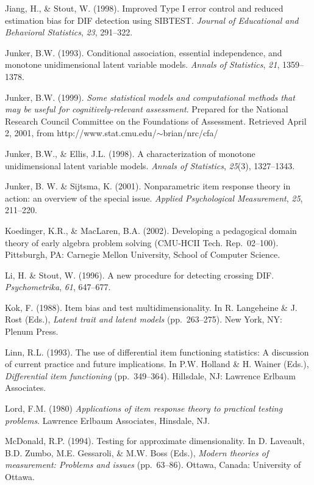 \documentclass[titlepage,11pt,twoside]{article}
\begin{document}
\begin{thebibliography}
\bibitem Jiang, H., \& Stout, W. (1998). Improved Type I error control and reduced estimation bias for DIF detection using SIBTEST. \textit{Journal of Educational and Behavioral Statistics}, \textit{23}, 291--322.

\bibitem Junker, B.W. (1993). Conditional association, essential independence, and monotone unidimensional latent variable models. \textit{Annals of Statistics}, \textit{21}, 1359--1378.

\bibitem Junker, B.W. (1999). \textit{Some statistical models and computational methods that may be useful for cognitively-relevant assessment}. Prepared for the National Research Council Committee on the Foundations of Assessment. Retrieved April 2, 2001, from \mbox{http://www.stat.cmu.edu/$\sim $brian/nrc/cfa/}

\bibitem Junker, B.W., \& Ellis, J.L. (1998). A characterization of monotone unidimensional latent variable models. \textit{Annals of Statistics}, \textit{25}(3), 1327--1343.

\bibitem Junker, B. W. \& Sijtsma, K. (2001). Nonparametric item response theory in action: an overview of the special issue. \textit{Applied Psychological Measurement}, \textit{25}, 211--220.

\bibitem Koedinger, K.R., \& MacLaren, B.A. (2002). Developing a pedagogical domain theory of early algebra problem solving (CMU-HCII Tech. Rep.~02--100). Pittsburgh, PA: Carnegie Mellon University, School of Computer Science.

\bibitem Li, H. \& Stout, W. (1996). A new procedure for detecting crossing DIF. \textit{Psychometrika}, \textit{61}, 647--677.

\bibitem Kok, F. (1988). Item bias and test multidimensionality. In R. Langeheine \& J. Rost (Eds.), \textit{Latent trait and latent models} (pp.~263--275). New York, NY: Plenum Press.

\bibitem Linn, R.L. (1993). The use of differential item functioning statistics: A discussion of current practice and future implications. In P.W. Holland \& H. Wainer (Eds.), \textit{Differential item functioning} (pp.~349--364). Hillsdale, NJ: Lawrence Erlbaum Associates.


\bibitem Lord, F.M. (1980) \textit{Applications of item response theory to practical testing problems}. Lawrence Erlbaum Associates, Hinsdale, NJ.

\bibitem McDonald, R.P. (1994). Testing for approximate dimensionality. In D. Laveault, B.D. Zumbo, M.E. Gessaroli, \& M.W. Boss (Eds.), \textit{Modern theories of measurement: Problems and issues} (pp.~63--86). Ottawa, Canada: University of Ottawa.


\end{thebibliography}
\end{document}
